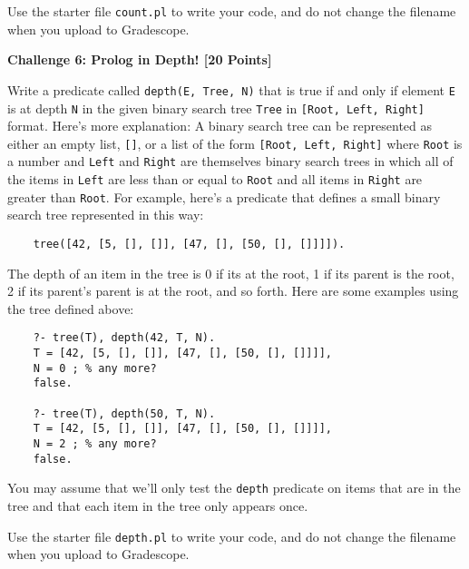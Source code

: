 \documentclass[12pt]{article}
\newcommand{\Problem}[3]{\mbox{} \newline \noindent \textbf{\textbf{Challenge #1: #2 [#3 Points] \\ }}}
\begin{document}
     Use the starter file \verb+count.pl+ to write your code, and do not change the filename when you upload to Gradescope.
	
\Problem{6}{Prolog in Depth!}{20}

Write a predicate called \verb+depth(E, Tree, N)+ that is true if and only if element \verb+E+ is at depth \verb+N+ in the given binary search tree \verb+Tree+ in \verb+[Root, Left, Right]+ format.  Here's more explanation:
	 A binary search tree can be represented as either an empty list, \verb+[]+, or a list of the form \verb+[Root, Left, Right]+ where \verb+Root+ is a number and \verb+Left+ and \verb+Right+ are themselves binary search trees in which all of the items in \verb+Left+ are less than or equal to \verb+Root+ and all items in \verb+Right+ are greater than \verb+Root+.  For example, here's a predicate that defines a small binary search tree represented in this way:
	\begin{verbatim}
	tree([42, [5, [], []], [47, [],	[50, [], []]]]).
	\end{verbatim}
	
	The depth of an item in the tree is 0 if its at the root, 1 if its parent is the root, 2 if its parent's parent is at the root, and so forth.  Here are some examples using the tree defined above:
	\begin{verbatim}
	?- tree(T), depth(42, T, N).
	T = [42, [5, [], []], [47, [], [50, [], []]]],
	N = 0 ; % any more?
	false.
	
	?- tree(T), depth(50, T, N).
	T = [42, [5, [], []], [47, [], [50, [], []]]],
	N = 2 ; % any more?
	false.
	\end{verbatim}
	
	You may assume that we'll only test the \verb+depth+ predicate on items that are in the tree and that each item in the tree only appears once.

    Use the starter file \verb+depth.pl+ to write your code, and do not change the filename when you upload to Gradescope.
\end{document}

